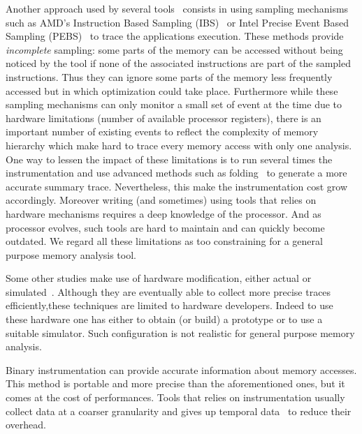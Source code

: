 Another approach used by several
tools~\cite{Lachaize12MemProf,McCurdy10Memphis,Liu14Tool,Gimenez14Dissecting}
consists in using sampling mechanisms such as AMD's Instruction Based Sampling
(IBS)~\cite{Drongowski07Instructionbased} or Intel Precise Event Based
Sampling (PEBS)~\cite{Levinthal2009} to trace the applications execution. These methods
provide \emph{incomplete} sampling: some parts of the memory can be accessed without
being noticed by the tool if none of the associated instructions are part of the sampled
instructions.
Thus they can ignore some parts of the memory less frequently accessed but in which
optimization could take place.
Furthermore while these sampling mechanisms can only monitor a small set of event
at the time due to hardware limitations (number of available processor
registers), there is an important number of existing events to reflect the
complexity of memory hierarchy which make hard to trace every memory
access with only one analysis.
One way to lessen the impact of these limitations is to run several times the
instrumentation and use advanced methods such as
folding~\cite{Servat15Towards} to generate a more accurate summary trace.
Nevertheless, this make the instrumentation cost grow accordingly.
Moreover writing (and sometimes) using tools that relies on hardware mechanisms
requires a deep knowledge of the processor. And as processor evolves,
such tools are hard to maintain and can quickly become outdated.
We regard all these limitations as too constraining for a general purpose
memory analysis tool.

Some other studies make use of hardware modification, either actual or
simulated~\cite{Bao08HMTT,Martonosi92MemSpy}.  Although they are eventually able to collect
more precise traces efficiently,these techniques are limited to hardware
developers. Indeed to use these hardware one has either to obtain (or build) a
prototype or to use a suitable simulator. Such configuration is not realistic
for general purpose memory analysis.

Binary instrumentation can provide accurate information about memory accesses.
This method is portable and  more precise than the aforementioned ones,
but it comes at the cost of performances. 
Tools that relies on instrumentation usually collect data at a coarser granularity and gives up temporal
data~\cite{Beniamine15TABARNAC} to reduce their overhead.


